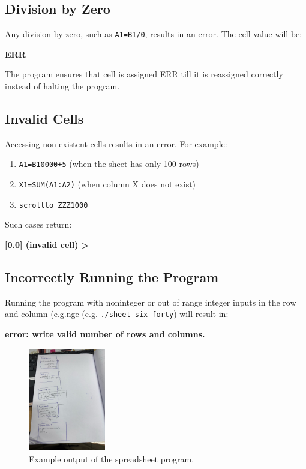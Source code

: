 \documentclass[a4paper]{article}
\begin{document}
\subsection{Division by Zero}
Any division by zero, such as \texttt{A1=B1/0}, results in an error. The cell value will be:
\begin{center}
    \textbf{ERR}
\end{center}
The program ensures that cell is assigned ERR till it is reassigned correctly instead of halting the program.

\subsection{Invalid Cells}
Accessing non-existent cells results in an error. For example:
\begin{enumerate}
    \item \texttt{A1=B10000+5} (when the sheet has only 100 rows)
    \item \texttt{X1=SUM(A1:A2)} (when column X does not exist)
    \item \texttt{scrollto ZZZ1000} 
\end{enumerate}
Such cases return:
\begin{center}
    \textbf{[0.0] (invalid cell) >}
\end{center}

\subsection{Incorrectly Running the Program}
Running the program with noninteger or out of range integer inputs in the row and column (e.g.nge (e.g. \texttt{./sheet six forty}) will result in:
\begin{center}
    \textbf{error: write valid number of rows and columns.}
\end{center}

\begin{figure}
\centering
\includegraphics[width=0.3\textwidth]{copass.jpg}
\caption{Example output of the spreadsheet program.}
\end{figure}
\end{document}
